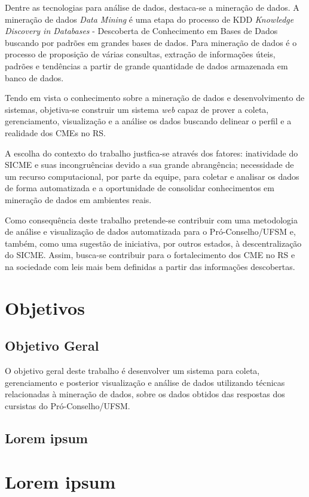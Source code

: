 \documentclass[projtg]{mdtufsm}
\begin{document}
Dentre as tecnologias para análise de dados, destaca-se a mineração de dados. A mineração de dados {\it Data Mining} é uma etapa do processo de KDD {\it Knowledge Discovery in Databases} - Descoberta de Conhecimento em Bases de Dados buscando por padrões em grandes bases de dados. Para \cite{Thuraisingham99} mineração de dados é o processo de proposição de várias consultas, extração de informações úteis, padrões e tendências a partir de grande quantidade de dados armazenada em banco de dados. 

Tendo em vista o conhecimento sobre a mineração de dados e desenvolvimento de sistemas, objetiva-se construir um sistema {\it web} capaz de prover a coleta, gerenciamento, visualização e a análise os dados buscando delinear o perfil e a realidade dos CMEs no RS.

A escolha do contexto do trabalho justfica-se através dos fatores: inatividade do SICME e suas incongruências devido a sua grande abrangência; necessidade de um recurso computacional, por parte da equipe, para coletar e analisar os dados de forma automatizada e a oportunidade de consolidar conhecimentos em mineração de dados em ambientes reais.

Como consequência deste trabalho pretende-se contribuir com uma metodologia de análise e visualização de dados automatizada para o Pró-Conselho/UFSM e, também, como uma sugestão de iniciativa, por outros estados, à descentralização do SICME. Assim, busca-se contribuir para o fortalecimento dos CME no RS e na sociedade com leis mais bem definidas a partir das informações descobertas. 

\chapter{Objetivos}
\section{Objetivo Geral}

O objetivo geral deste trabalho é desenvolver um sistema para coleta, gerenciamento e posterior visualização e análise de dados utilizando técnicas relacionadas à mineração de dados, sobre os dados obtidos das respostas dos cursistas do Pró-Conselho/UFSM. 
	
\section{Lorem ipsum}


\chapter{Lorem ipsum}
\end{document}
